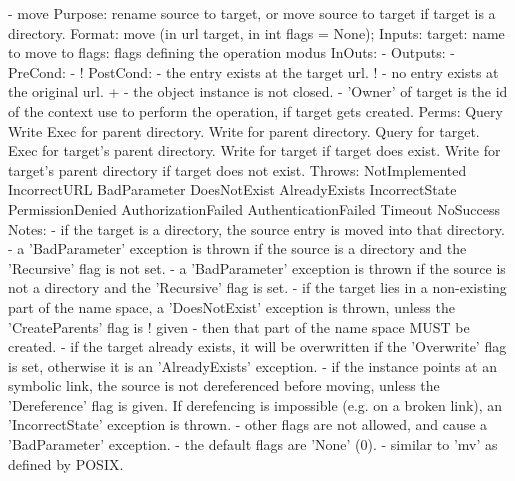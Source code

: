 \begin{myspec}
 
    - move
      Purpose:  rename source to target, or move source to
                target if target is a directory.
      Format:   move               (in  url       target,
                                    in  int       flags = None);
      Inputs:   target:             name to move to
                flags:              flags defining the operation
                                    modus
      InOuts:   -
      Outputs:  -
      PreCond:  -
!     PostCond: - the entry exists at the target url.
!               - no entry exists at the original url.
+               - the object instance is not closed.
                - 'Owner' of target is the id of the context
                  use to perform the operation, if target gets
                  created.
      Perms:    Query 
                Write 
                Exec  for parent directory.
                Write for parent directory.
                Query for target.
                Exec  for target's parent directory.
                Write for target
                      if  target does exist.
                Write for target's parent directory 
                      if  target does not exist.
      Throws:   NotImplemented
                IncorrectURL
                BadParameter
                DoesNotExist
                AlreadyExists
                IncorrectState
                PermissionDenied
                AuthorizationFailed
                AuthenticationFailed
                Timeout
                NoSuccess
      Notes:    - if the target is a directory, the source entry
                  is moved into that directory.
                - a 'BadParameter' exception is thrown if the 
                  source is a directory and the 'Recursive' flag 
                  is not set.
                - a 'BadParameter' exception is thrown if the 
                  source is not a directory and the 'Recursive' 
                  flag is set.
                - if the target lies in a non-existing part of
                  the name space, a 'DoesNotExist' exception is
                  thrown, unless the 'CreateParents' flag is
!                 given - then that part of the name space MUST
                  be created.
                - if the target already exists, it will be
                  overwritten if the 'Overwrite' flag is set,
                  otherwise it is an 'AlreadyExists' exception.
                - if the instance points at an symbolic link, 
                  the source is not dereferenced before moving,
                  unless the 'Dereference' flag is given.
                  If derefencing is impossible (e.g. on a broken 
                  link), an 'IncorrectState' exception is thrown.
                - other flags are not allowed, and cause a
                  'BadParameter' exception.
                - the default flags are 'None' (0).
                - similar to 'mv' as defined by POSIX.
 

\end{myspec}
